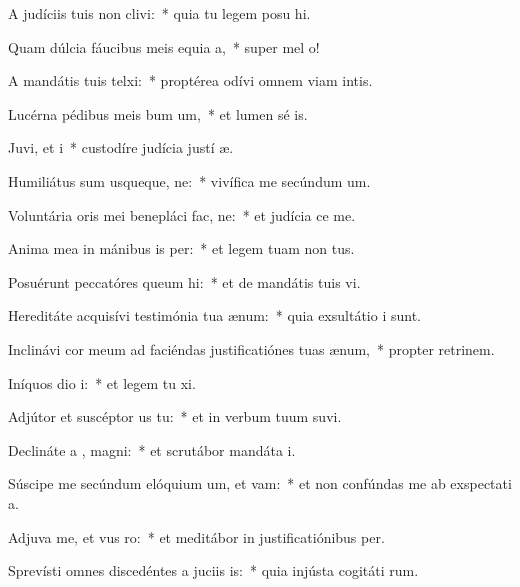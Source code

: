 \item A judíciis tuis non clivi:~* quia tu legem posu hi.
\item Quam dúlcia fáucibus meis equia a,~* super mel  o!
\item A mandátis tuis telxi:~* proptérea odívi omnem viam intis.
\item Lucérna pédibus meis bum um,~* et lumen sé is.
\item Juvi, et i~* custodíre judícia justí æ.
\item Humiliátus sum usqueque, ne:~* vivífica me secúndum  um.
\item Voluntária oris mei benepláci fac, ne:~* et judícia  ce me.
\item Anima mea in mánibus is per:~* et legem tuam non  tus.
\item Posuérunt peccatóres queum hi:~* et de mandátis tuis  vi.
\item Hereditáte acquisívi testimónia tua  ænum:~* quia exsultátio  i sunt.
\item Inclinávi cor meum ad faciéndas justificatiónes tuas  ænum,~* propter retrinem.
\item Iníquos dio i:~* et legem tu xi.
\item Adjútor et suscéptor us  tu:~* et in verbum tuum suvi.
\item Declináte a , magni:~* et scrutábor mandáta  i.
\item Súscipe me secúndum elóquium um, et vam:~* et non confúndas me ab exspectati a.
\item Adjuva me, et vus ro:~* et meditábor in justificatiónibus  per.
\item Sprevísti omnes discedéntes a juciis is:~* quia injústa cogitáti rum.
